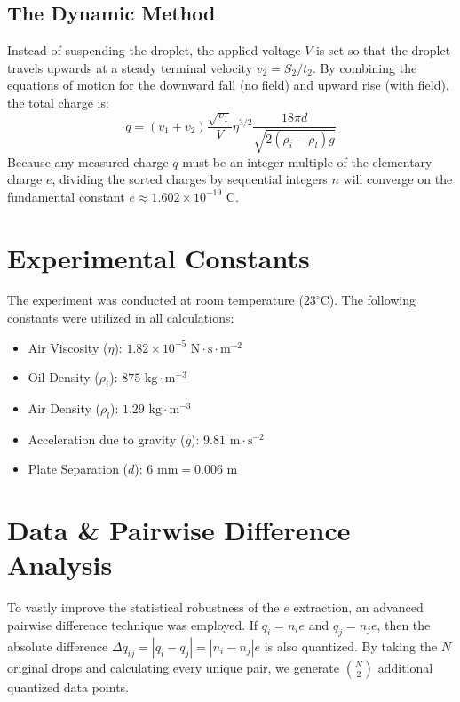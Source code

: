 \documentclass[a4paper,11pt]{article}
\begin{document}
\subsection{The Dynamic Method}
Instead of suspending the droplet, the applied voltage $V$ is set so that the droplet travels upwards at a steady terminal velocity $v_2 = S_2/t_2$. By combining the equations of motion for the downward fall (no field) and upward rise (with field), the total charge is:
\begin{equation} \label{eq:dynamic}
    q = (v_1 + v_2) \frac{\sqrt{v_1}}{V} \eta^{3/2} \frac{18\pi d}{\sqrt{2(\rho_i - \rho_l)g}}
\end{equation}
Because any measured charge $q$ must be an integer multiple of the elementary charge $e$, dividing the sorted charges by sequential integers $n$ will converge on the fundamental constant $e \approx 1.602 \times 10^{-19}\text{ C}$.

\section{Experimental Constants}
The experiment was conducted at room temperature ($23^\circ\text{C}$). The following constants were utilized in all calculations:
\begin{itemize}
    \item Air Viscosity ($\eta$): $1.82 \times 10^{-5}\text{ N}\cdot\text{s}\cdot\text{m}^{-2}$
    \item Oil Density ($\rho_i$): $875\text{ kg}\cdot\text{m}^{-3}$
    \item Air Density ($\rho_l$): $1.29\text{ kg}\cdot\text{m}^{-3}$
    \item Acceleration due to gravity ($g$): $9.81\text{ m}\cdot\text{s}^{-2}$
    \item Plate Separation ($d$): $6\text{ mm} = 0.006\text{ m}$
\end{itemize}

\section{Data \& Pairwise Difference Analysis}

To vastly improve the statistical robustness of the $e$ extraction, an advanced pairwise difference technique was employed. If $q_i = n_i e$ and $q_j = n_j e$, then the absolute difference $\Delta q_{ij} = |q_i - q_j| = |n_i - n_j|e$ is also quantized. By taking the $N$ original drops and calculating every unique pair, we generate $\binom{N}{2}$ additional quantized data points.
\end{document}

